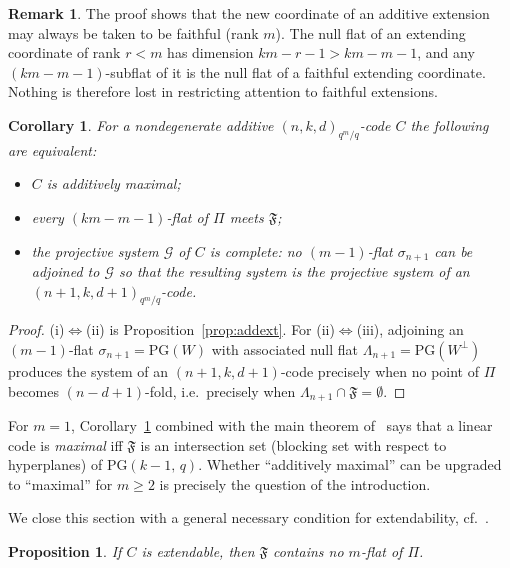 \documentclass[12pt]{article}
\newtheorem{cor}[thm]{Corollary}
\newtheorem{prop}[thm]{Proposition}
\theoremstyle{definition}
\newtheorem{rem}[thm]{Remark}
\numberwithin{equation}{section}
\newcommand{\G}{\mathcal{G}}
\newcommand{\PG}[2]{\mathrm{PG}(#1,\,#2)}
\newcommand{\PGv}[1]{\mathrm{PG}(#1)}
\newcommand{\Afold}{\mathfrak{F}}
\begin{document}
\begin{rem}\label{rem:faithfulext}
The proof shows that the new coordinate of an additive extension may always be taken to be faithful (rank $m$).  The null flat of an extending coordinate of rank $r<m$ has dimension $km-r-1>km-m-1$, and any $(km-m-1)$-subflat of it is the null flat of a faithful extending coordinate.  Nothing is therefore lost in restricting attention to faithful extensions.
\end{rem}

\begin{cor}\label{cor:addmax}
For a nondegenerate additive $(n,k,d)_{q^m/q}$-code $C$ the following are equivalent:
\begin{itemize}
\item[(i)] $C$ is additively maximal;
\item[(ii)] every $(km-m-1)$-flat of $\Pi$ meets $\Afold$;
\item[(iii)] the projective system $\G$ of $C$ is complete: no $(m-1)$-flat $\sigma_{n+1}$ can be adjoined to $\G$ so that the resulting system is the projective system of an $(n+1,k,d+1)_{q^m/q}$-code.
\end{itemize}
\end{cor}

\begin{proof}
(i)$\iff$(ii) is Proposition~\ref{prop:addext}.  For (ii)$\iff$(iii), adjoining an $(m-1)$-flat $\sigma_{n+1}=\PGv{W}$ with associated null flat $\Lambda_{n+1}=\PGv{W^{\perp}}$ produces the system of an $(n+1,k,d+1)$-code precisely when no point of $\Pi$ becomes $(n-d+1)$-fold, i.e.\ precisely when $\Lambda_{n+1}\cap\Afold=\emptyset$.
\end{proof}

For $m=1$, Corollary~\ref{cor:addmax} combined with the main theorem of~\cite{MR2529622} says that a linear code is \emph{maximal} iff $\Afold$ is an intersection set (blocking set with respect to hyperplanes) of $\PG{k-1}{q}$.  Whether ``additively maximal'' can be upgraded to ``maximal'' for $m\geq2$ is precisely the question of the introduction.

We close this section with a general necessary condition for extendability, cf.\ \cite[Proposition~2]{MR1869411}.

\begin{prop}\label{prop:mflat}
If $C$ is extendable, then $\Afold$ contains no $m$-flat of $\Pi$.
\end{prop}
\end{document}
